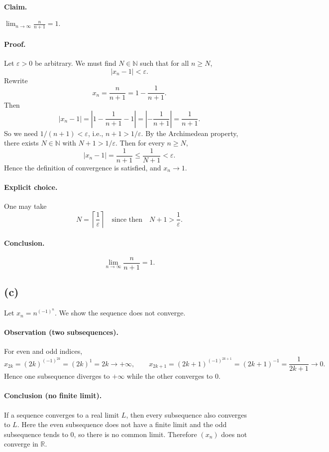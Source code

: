\documentclass[12pt,a4paper]{article}
\theoremstyle{definition}
\theoremstyle{remark}
\begin{document}
\paragraph{Claim.} \(\displaystyle \lim_{n\to\infty} \frac{n}{n+1} = 1.\)

\paragraph{Proof.}
Let \(\varepsilon>0\) be arbitrary. We must find \(N\in\mathbb{N}\) such that for all \(n\ge N\),
\[
\left| x_n - 1 \right| < \varepsilon.
\]
Rewrite
\[
x_n = \frac{n}{n+1} = 1 - \frac{1}{n+1}.
\]
Then
\[
|x_n-1| = \left|1 - \frac{1}{n+1} - 1\right| = \left|-\frac{1}{n+1}\right| = \frac{1}{n+1}.
\]
So we need \(1/(n+1) < \varepsilon\), i.e., \(n+1 > 1/\varepsilon\). By the Archimedean property, there exists \(N\in\mathbb{N}\) with \(N+1 > 1/\varepsilon\). Then for every \(n\ge N\),
\[
\left| x_n - 1 \right| = \frac{1}{n+1} \le \frac{1}{N+1} < \varepsilon.
\]
Hence the definition of convergence is satisfied, and \(x_n \to 1\).

\paragraph{Explicit choice.} One may take
\[
N = \left\lceil \frac{1}{\varepsilon} \right\rceil
\quad\text{since then}\quad
N+1 > \frac{1}{\varepsilon}.
\]

\paragraph{Conclusion.}
\[
\boxed{\lim_{n\to\infty} \frac{n}{n+1} = 1.}
\]


\subsection*{(c)}
Let \(x_n = n^{(-1)^n}\). We show the sequence does not converge.

\paragraph{Observation (two subsequences).}
For even and odd indices,
\[
x_{2k} = (2k)^{(-1)^{2k}} = (2k)^1 = 2k \longrightarrow +\infty,
\qquad
x_{2k+1} = (2k+1)^{(-1)^{2k+1}} = (2k+1)^{-1} = \frac{1}{2k+1} \longrightarrow 0.
\]
Hence one subsequence diverges to $+\infty$ while the other converges to $0$.

\paragraph{Conclusion (no finite limit).}
If a sequence converges to a real limit $L$, then every subsequence also converges to $L$. Here the even subsequence does not have a finite limit and the odd subsequence tends to $0$, so there is no common limit. Therefore $(x_n)$ does not converge in $\mathbb{R}$.
\end{document}
